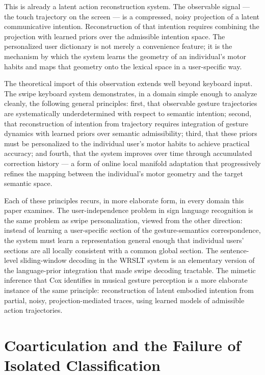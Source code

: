 \documentclass[11pt, a4paper]{article}
\theoremstyle{definition}
\begin{document}
This is already a latent action reconstruction system. The observable signal --- the touch trajectory on the screen --- is a compressed, noisy projection of a latent communicative intention. Reconstruction of that intention requires combining the projection with learned priors over the admissible intention space. The personalized user dictionary is not merely a convenience feature; it is the mechanism by which the system learns the geometry of an individual's motor habits and maps that geometry onto the lexical space in a user-specific way.

The theoretical import of this observation extends well beyond keyboard input. The swipe keyboard system demonstrates, in a domain simple enough to analyze cleanly, the following general principles: first, that observable gesture trajectories are systematically underdetermined with respect to semantic intention; second, that reconstruction of intention from trajectory requires integration of gesture dynamics with learned priors over semantic admissibility; third, that these priors must be personalized to the individual user's motor habits to achieve practical accuracy; and fourth, that the system improves over time through accumulated correction history --- a form of online local manifold adaptation that progressively refines the mapping between the individual's motor geometry and the target semantic space.

Each of these principles recurs, in more elaborate form, in every domain this paper examines. The user-independence problem in sign language recognition is the same problem as swipe personalization, viewed from the other direction: instead of learning a user-specific section of the gesture-semantics correspondence, the system must learn a representation general enough that individual users' sections are all locally consistent with a common global section. The sentence-level sliding-window decoding in the WRSLT system is an elementary version of the language-prior integration that made swipe decoding tractable. The mimetic inference that Cox identifies in musical gesture perception is a more elaborate instance of the same principle: reconstruction of latent embodied intention from partial, noisy, projection-mediated traces, using learned models of admissible action trajectories.

\section{Coarticulation and the Failure of Isolated Classification}
\end{document}
